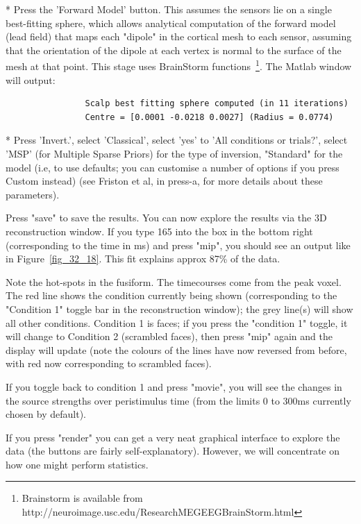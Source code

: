 * Press the 'Forward Model' button. This assumes the sensors lie on a single best-fitting sphere, which allows analytical computation of the forward model (lead field) that maps each "dipole" in the cortical mesh to each sensor, assuming that the orientation of the dipole at each vertex is normal to the surface of the mesh at that point. This stage uses BrainStorm functions~\footnote{Brainstorm is available from http://neuroimage.usc.edu/ResearchMEGEEGBrainStorm.html}. The Matlab window will output:
\begin{verbatim}
                Scalp best fitting sphere computed (in 11 iterations)
                Centre = [0.0001 -0.0218 0.0027] (Radius = 0.0774)
\end{verbatim}
* Press 'Invert.', select 'Classical', select 'yes' to 'All conditions or trials?', select 'MSP' (for Multiple Sparse Priors) for the type of inversion, "Standard" for the model (i.e, to use defaults; you can customise a number of options if you press Custom instead) (see Friston et al, in press-a, for more details about these parameters).

Press "save" to save the results. You can now explore the results via the 3D reconstruction window. If you type 165 into the box in the bottom right (corresponding to the time in ms) and press "mip", you should see an output like in Figure~\ref{fig_32_18}. This fit explains approx 87\% of the data.

Note the hot-spots in the fusiform. The timecourses come from the peak voxel. The red line shows the condition currently being shown (corresponding to the "Condition 1" toggle bar in the reconstruction window); the grey line(s) will show all other conditions. Condition 1 is faces; if you press the "condition 1" toggle, it will change to Condition 2 (scrambled faces), then press "mip" again and the display will update (note the colours of the lines have now reversed from before, with red now corresponding to scrambled faces).

If you toggle back to condition 1 and press "movie", you will see the changes in the source strengths over peristimulus time (from the limits 0 to 300ms currently chosen by default).

If you press "render" you can get a very neat graphical interface to explore the data (the buttons are fairly self-explanatory). However, we will concentrate on how one might perform statistics.


